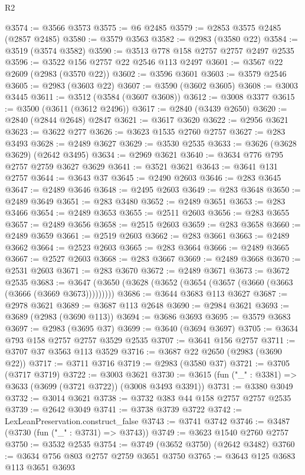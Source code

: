 \begin{lexlean}{R2}
\begin{coremodule}
@3574 := @3566 @3573
@3575 := @6 @2485
@3579 := @2853 @3575 @2485 (@2857 @2485)
@3580 := @3579 @3563
@3582 := @2983 (@3580 @22)
@3584 := @3519 (@3574 @3582)
@3590 := @3513 @778 @158 @2757 @2757 @2497 @2535
@3596 := @3522 @156 @2757 @22 @2546 @113 @2497
@3601 := @3567 @22 @2609 (@2983 (@3570 @22))
@3602 := @3596 @3601
@3603 := @3579 @2546
@3605 := @2983 (@3603 @22)
@3607 := @3590 (@3602 @3605)
@3608 := @3003 @3445
@3611 := @3512 (@3584 (@3607 @3608))
@3612 := @3008 @3377
@3615 := @3500 (@3611 (@3612 @2496))
@3617 := @2840 (@3439 @2650)
@3620 := @2840 (@2844 @2648) @2847
@3621 := @3617 @3620
@3622 := @2956 @3621
@3623 := @3622 @277
@3626 := @3623 @1535 @2760 @2757
@3627 := @283 @3493
@3628 := @2489 @3627
@3629 := @3530 @2535
@3633 := @3626 (@3628 @3629) (@2642 @3495)
@3634 := @2969 @3621
@3640 := @3634 @776 @795 @2757 @2759 @3627 @3629
@3641 := @3521 @3621
@3643 := @3641 @131 @2757
@3644 := @3643 @37
@3645 := @2490 @2603
@3646 := @283 @3645
@3647 := @2489 @3646
@3648 := @2495 @2603
@3649 := @283 @3648
@3650 := @2489 @3649
@3651 := @283 @3480
@3652 := @2489 @3651
@3653 := @283 @3466
@3654 := @2489 @3653
@3655 := @2511 @2603
@3656 := @283 @3655
@3657 := @2489 @3656
@3658 := @2515 @2603
@3659 := @283 @3658
@3660 := @2489 @3659
@3661 := @2519 @2603
@3662 := @283 @3661
@3663 := @2489 @3662
@3664 := @2523 @2603
@3665 := @283 @3664
@3666 := @2489 @3665
@3667 := @2527 @2603
@3668 := @283 @3667
@3669 := @2489 @3668
@3670 := @2531 @2603
@3671 := @283 @3670
@3672 := @2489 @3671
@3673 := @3672 @2535
@3683 := @3647 (@3650 (@3628 (@3652 (@3654 (@3657 (@3660 (@3663 (@3666 (@3669 @3673)))))))))
@3686 := @3644 @3683 @113 @3627
@3687 := @2978 @3621
@3689 := @3687 @113 @2648
@3690 := @2984 @3621
@3693 := @3689 (@2983 (@3690 @113))
@3694 := @3686 @3693
@3695 := @3579 @3683
@3697 := @2983 (@3695 @37)
@3699 := @3640 (@3694 @3697)
@3705 := @3634 @793 @158 @2757 @2757 @3529 @2535
@3707 := @3641 @156 @2757
@3711 := @3707 @37 @3563 @113 @3529
@3716 := @3687 @22 @2650 (@2983 (@3690 @22))
@3717 := @3711 @3716
@3719 := @2983 (@3580 @37)
@3721 := @3705 (@3717 @3719)
@3722 := @3003 @3621
@3730 := @3615 (fun ("_" : @3381) => @3633 (@3699 (@3721 @3722)) (@3008 @3493 @3391))
@3731 := @3380 @3049
@3732 := @3014 @3621
@3738 := @3732 @383 @44 @158 @2757 @2757 @2535
@3739 := @2642 @3049
@3741 := @3738 @3739 @3722
@3742 := LexLeanPreservation.construct_false
@3743 := @3741 @3742
@3746 := @3487 (@3730 (fun ("_" : @3731) => @3743))
@3749 := @3623 @1540 @2760 @2757
@3750 := @3532 @2535
@3754 := @3749 (@3652 @3750) (@2642 @3482)
@3760 := @3634 @756 @803 @2757 @2759 @3651 @3750
@3765 := @3643 @125 @3683 @113 @3651 @3693

\end{coremodule}
\end{lexlean}
